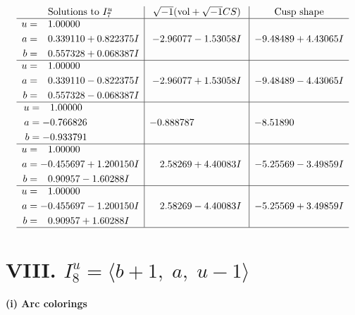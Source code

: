 \documentclass[1p]{elsarticle_modified}
\theoremstyle{definition}
\newcommand{\I}{\sqrt{-1}}
\begin{document}
$$\begin{array}{c|c|c}  
\text{Solutions to }I^u_{7}& \I (\text{vol} + \sqrt{-1}CS) & \text{Cusp shape}\\
 \hline 
\begin{aligned}
u &= \phantom{-}1.00000\phantom{ +0.000000I} \\
a &= \phantom{-}0.339110 + 0.822375 I \\
b &= \phantom{-}0.557328 + 0.068387 I\end{aligned}
 & -2.96077 - 1.53058 I & -9.48489 + 4.43065 I \\ \hline\begin{aligned}
u &= \phantom{-}1.00000\phantom{ +0.000000I} \\
a &= \phantom{-}0.339110 - 0.822375 I \\
b &= \phantom{-}0.557328 - 0.068387 I\end{aligned}
 & -2.96077 + 1.53058 I & -9.48489 - 4.43065 I \\ \hline\begin{aligned}
u &= \phantom{-}1.00000\phantom{ +0.000000I} \\
a &= -0.766826\phantom{ +0.000000I} \\
b &= -0.933791\phantom{ +0.000000I}\end{aligned}
 & -0.888787\phantom{ +0.000000I} & -8.51890\phantom{ +0.000000I} \\ \hline\begin{aligned}
u &= \phantom{-}1.00000\phantom{ +0.000000I} \\
a &= -0.455697 + 1.200150 I \\
b &= \phantom{-}0.90957 - 1.60288 I\end{aligned}
 & \phantom{-}2.58269 + 4.40083 I & -5.25569 - 3.49859 I \\ \hline\begin{aligned}
u &= \phantom{-}1.00000\phantom{ +0.000000I} \\
a &= -0.455697 - 1.200150 I \\
b &= \phantom{-}0.90957 + 1.60288 I\end{aligned}
 & \phantom{-}2.58269 - 4.40083 I & -5.25569 + 3.49859 I\\
 \hline 
 \end{array}$$\newpage\newpage\renewcommand{\arraystretch}{1}
\centering \section*{VIII. $I^u_{8}= \langle b+1,\;a,\;u-1 \rangle$}
\flushleft \textbf{(i) Arc colorings}\\
\end{document}
